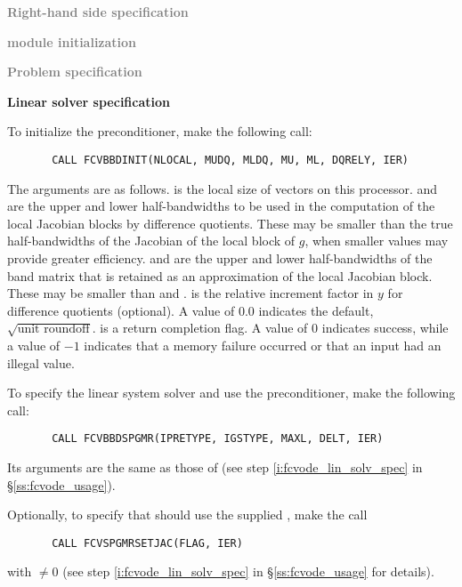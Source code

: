 \begin{Steps}
  
\item \textcolor{gray}{\bf Right-hand side specification}

\item \textcolor{gray}{\bf {\nvector} module initialization}

\item \textcolor{gray}{\bf Problem specification}

\item {\bf Linear solver specification}

  To initialize the {\cvbbdpre} preconditioner, make the following call:
\begin{verbatim}
       CALL FCVBBDINIT(NLOCAL, MUDQ, MLDQ, MU, ML, DQRELY, IER)
\end{verbatim}
  The arguments are as follows.
   is the local size of vectors on this processor.
   and  are the upper and lower half-bandwidths to be used in 
  the computation of the local Jacobian blocks by difference quotients.
  These may be smaller than the true half-bandwidths of the
  Jacobian of the local block of $g$, when smaller values may
  provide greater efficiency.
   and  are the upper and lower half-bandwidths of the band matrix
  that  is retained as an approximation of the local Jacobian block.
  These may be smaller than  and .
   is the relative increment factor in $y$ for difference quotients
  (optional).  A value of $0.0$ indicates the default, $\sqrt{\text{unit roundoff}}$.
   is a return completion flag.  A value of $0$ indicates success, while
  a value of $-1$ indicates that a memory failure occurred or that an input had
  an illegal value.
  
  To specify the {\spgmr} linear system solver and use the {\cvbbdpre}
  preconditioner, make the following call:
\begin{verbatim}
       CALL FCVBBDSPGMR(IPRETYPE, IGSTYPE, MAXL, DELT, IER)
\end{verbatim}
  Its arguments are the same as those of 
  (see step \ref{i:fcvode_lin_solv_spec} in \S\ref{ss:fcvode_usage}).
  

  Optionally, to specify that {\spgmr} should use the supplied , 
  make the call
\begin{verbatim}
       CALL FCVSPGMRSETJAC(FLAG, IER)
\end{verbatim}
  with $\neq 0$ 
  (see step \ref{i:fcvode_lin_solv_spec} in \S\ref{ss:fcvode_usage} for details).
  

\end{Steps}
